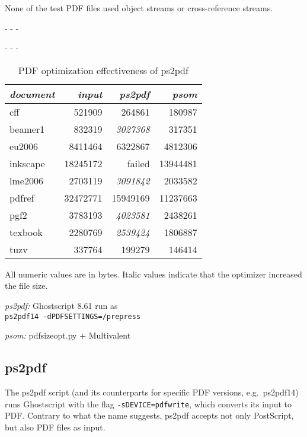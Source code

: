 \documentclass{ltugproc}
\def\cmd{\textsf}
\def\captiontop#1{%
  \advance\abovecaptionskip-\belowcaptionskip
  \advance\belowcaptionskip\abovecaptionskip
  \advance\abovecaptionskip-\belowcaptionskip
  \abovecaptionskip-\abovecaptionskip
  \caption{#1}%
  \advance\abovecaptionskip-\belowcaptionskip
  \advance\belowcaptionskip\abovecaptionskip
  \advance\abovecaptionskip-\belowcaptionskip
  \abovecaptionskip-\abovecaptionskip
}
\begin{document}
\noindent None of the test PDF files used object streams or
cross-reference streams.


\begin{table}[b]
\captiontop{PDF optimization effectiveness
of \cmd{ps2pdf}}\label{tab:eff-ps2pdf}
\par\small\noindent\hfil
\begin{tabular*}{\hsize}{@{\extracolsep{\fill}}lrrr@{}}
\toprule
\emph{document} & \emph{input} & \emph{ps2pdf} & \emph{psom} \\\midrule
cff         &   521909 &   264861 &   180987 \\
beamer1     &   832319 &  \emph{3027368} &   317351 \\
eu2006      &  8411464 &  6322867 &  4812306 \\
inkscape    & 18245172 &  failed  & 13944481 \\
lme2006     &  2703119 &  \emph{3091842} &  2033582 \\
pdfref      & 32472771 & 15949169 & 11237663 \\
pgf2        &  3783193 &  \emph{4023581} &  2438261 \\
texbook     &  2280769 &  \emph{2539424} &  1806887 \\
tuzv        &   337764 &   199279 &   146414 \\
\bottomrule
\end{tabular*}
\par\bigskip
\par\noindent All numeric values are in bytes.
Italic values indicate that the optimizer increased the file size.
\par\noindent\emph{ps2pdf:} Ghostscript 8.61 run as \\
\texttt{ps2pdf14 -dPDFSETTINGS=/prepress}
\par\noindent\emph{psom:} \cmd{pdfsizeopt.py} $+$ Multivalent
\end{table}

\subsection{ps2pdf}

The \cmd{ps2pdf} \cite{ps2pdf} script (and its counterparts for specific PDF
versions, e.g.\ \cmd{ps2pdf14}) runs Ghostscript with the flag
\texttt{-sDEVICE=pdfwrite}, which converts its input to PDF. Contrary to
what the name suggests, \cmd{ps2pdf} accepts not only PostScript, but also
PDF files as input.
\end{document}
